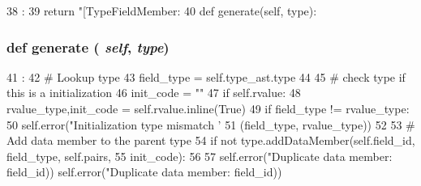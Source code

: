 \begin{DoxyCode}
38                       :
39         return "[TypeFieldMember: %
40 
    def generate(self, type):
\end{DoxyCode}
\hypertarget{classslicc_1_1ast_1_1TypeFieldMemberAST_1_1TypeFieldMemberAST_a4555d1cee0dccf3942ea35fe86de2e8e}{
\subsubsection[{generate}]{\setlength{\rightskip}{0pt plus 5cm}def generate ( {\em self}, \/   {\em type})}}
\label{classslicc_1_1ast_1_1TypeFieldMemberAST_1_1TypeFieldMemberAST_a4555d1cee0dccf3942ea35fe86de2e8e}



\begin{DoxyCode}
41                             :
42         # Lookup type
43         field_type = self.type_ast.type
44 
45         # check type if this is a initialization
46         init_code = ""
47         if self.rvalue:
48             rvalue_type,init_code = self.rvalue.inline(True)
49             if field_type != rvalue_type:
50                 self.error("Initialization type mismatch '%
51                            (field_type, rvalue_type))
52 
53         # Add data member to the parent type
54         if not type.addDataMember(self.field_id, field_type, self.pairs,
55                                   init_code):
56 
57             self.error("Duplicate data member: %
      field_id))
            self.error("Duplicate data member: %
      field_id))
\end{DoxyCode}


